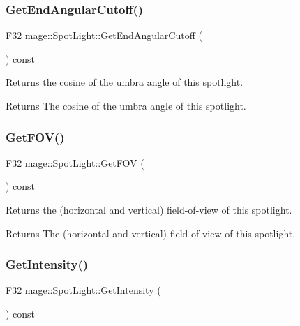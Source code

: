 \subsubsection{\texorpdfstring{Get\+End\+Angular\+Cutoff()}{GetEndAngularCutoff()}}
{\footnotesize\ttfamily \hyperlink{namespacemage_aa97e833b45f06d60a0a9c4fc22ae02c0}{F32} mage\+::\+Spot\+Light\+::\+Get\+End\+Angular\+Cutoff (\begin{DoxyParamCaption}{ }\end{DoxyParamCaption}) const\hspace{0.3cm}{\ttfamily [noexcept]}}

Returns the cosine of the umbra angle of this spotlight.

\begin{DoxyReturn}{Returns}
The cosine of the umbra angle of this spotlight. 
\end{DoxyReturn}
\hypertarget{classmage_1_1_spot_light_a6cbc0ac77c28796cc25a7131bfe4a1c1}{}\label{classmage_1_1_spot_light_a6cbc0ac77c28796cc25a7131bfe4a1c1} 
\subsubsection{\texorpdfstring{Get\+F\+O\+V()}{GetFOV()}}
{\footnotesize\ttfamily \hyperlink{namespacemage_aa97e833b45f06d60a0a9c4fc22ae02c0}{F32} mage\+::\+Spot\+Light\+::\+Get\+F\+OV (\begin{DoxyParamCaption}{ }\end{DoxyParamCaption}) const\hspace{0.3cm}{\ttfamily [noexcept]}}

Returns the (horizontal and vertical) field-\/of-\/view of this spotlight.

\begin{DoxyReturn}{Returns}
The (horizontal and vertical) field-\/of-\/view of this spotlight. 
\end{DoxyReturn}
\hypertarget{classmage_1_1_spot_light_a3df0792c637a6167c7c596ce125abbe0}{}\label{classmage_1_1_spot_light_a3df0792c637a6167c7c596ce125abbe0} 
\subsubsection{\texorpdfstring{Get\+Intensity()}{GetIntensity()}}
{\footnotesize\ttfamily \hyperlink{namespacemage_aa97e833b45f06d60a0a9c4fc22ae02c0}{F32} mage\+::\+Spot\+Light\+::\+Get\+Intensity (\begin{DoxyParamCaption}{ }\end{DoxyParamCaption}) const\hspace{0.3cm}{\ttfamily [noexcept]}}

